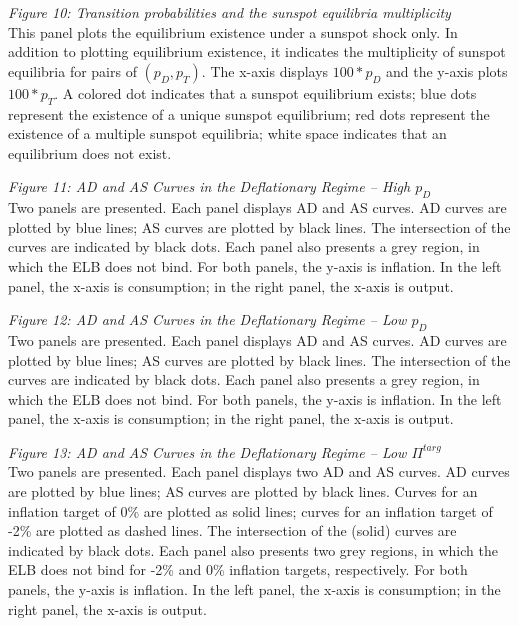 \documentclass[11pt]{article}
\begin{document}
	\noindent \emph{Figure 10: Transition probabilities and the sunspot equilibria multiplicity}\\
	\noindent This panel plots the equilibrium existence under a sunspot shock only. In addition to plotting equilibrium existence, it indicates the multiplicity of sunspot equilibria for pairs of $(p_D, p_T)$. The x-axis displays $100*p_D$ and the y-axis plots $100*p_T$. A colored dot indicates that a sunspot equilibrium exists; blue dots represent the existence of a unique sunspot equilibrium; red dots represent the existence of a multiple sunspot equilibria;  white space indicates that an equilibrium does not exist. \vspace{0.5cm}
	
	\noindent \emph{Figure 11: AD and AS Curves in the Deflationary Regime -- High $p_D$}\\
	\noindent Two panels are presented. Each panel displays AD and AS curves. AD curves are plotted by blue lines; AS curves are plotted by black lines. The intersection of the curves are indicated by black dots. Each panel also presents a grey region, in which the ELB does not bind. For both panels, the y-axis is inflation. In the left panel, the x-axis is consumption; in the right panel, the x-axis is output. \vspace{0.5cm}
	
	\noindent \emph{Figure 12: AD and AS Curves in the Deflationary Regime -- Low $p_D$}\\
	\noindent Two panels are presented. Each panel displays AD and AS curves. AD curves are plotted by blue lines; AS curves are plotted by black lines. The intersection of the curves are indicated by black dots. Each panel also presents a grey region, in which the ELB does not bind. For both panels, the y-axis is inflation. In the left panel, the x-axis is consumption; in the right panel, the x-axis is output. \vspace{0.5cm}
	
	\noindent \emph{Figure 13: AD and AS Curves in the Deflationary Regime -- Low $\Pi^{targ}$}\\
	\noindent Two panels are presented. Each panel displays two AD and AS curves. AD curves are plotted by blue lines; AS curves are plotted by black lines. Curves for an inflation target of 0\% are plotted as solid lines; curves for an inflation target of -2\% are plotted as dashed lines. The intersection of the (solid) curves are indicated by black dots. Each panel also presents two grey regions, in which the ELB does not bind for -2\% and 0\% inflation targets, respectively. For both panels, the y-axis is inflation. In the left panel, the x-axis is consumption; in the right panel, the x-axis is output. \vspace{0.5cm}
	
\end{document}
